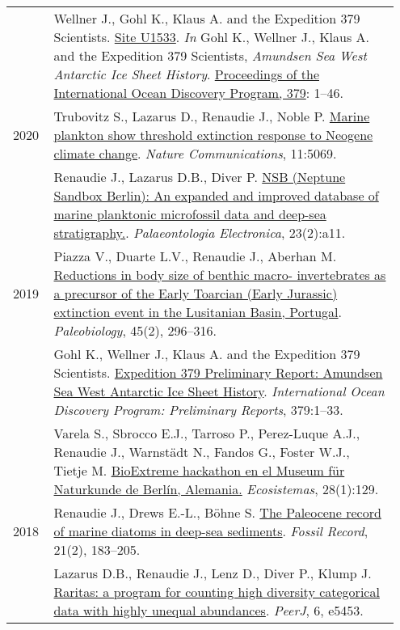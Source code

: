 \documentclass[11pt, a4paper]{article}
\makeatletter
\newcommand\fnoteref[1]{\protected@xdef\@theenmark{\ref{#1}}\@endnotemark}
\makeatother
\begin{document}
\begin{longtable}{@{}p{0.1\linewidth} >{\small}P{0.85\linewidth}@{}}
    & Wellner J., Gohl K., Klaus A. and the Expedition 379 Scientists\fnoteref{exp379scientists}. \href{https://doi.org/10.14379/iodp.proc.379.104.2021}{Site U1533}. \textit{In} Gohl K., Wellner J., Klaus A. and the Expedition 379 Scientists, \textit{Amundsen Sea West Antarctic Ice Sheet History}. \href{http://publications.iodp.org/proceedings/379/379title.html}{Proceedings of the International Ocean Discovery Program, 379}: 1--46.\\
2020 & Trubovitz S., Lazarus D., Renaudie J., Noble P. \href{http://doi.org/10.1038/s41467-020-18879-7}{Marine plankton show threshold extinction response to Neogene climate change}. \textit{Nature Communications}, 11:5069.\\
    & Renaudie J., Lazarus D.B., Diver P. \href{https://palaeo-electronica.org/content/2020/2966-the-nsb-database}{NSB (Neptune Sandbox Berlin): An expanded and improved database of marine planktonic microfossil data and deep-sea stratigraphy.}. \textit{Palaeontologia Electronica}, 23(2):a11.\\
2019 & Piazza V., Duarte L.V., Renaudie J., Aberhan M. \href{http://doi.org/10.1017/pab.2019.11}{Reductions in body size of benthic macro- invertebrates as a precursor of the Early Toarcian (Early Jurassic) extinction event in the Lusitanian Basin, Portugal}. \textit{Paleobiology}, 45(2), 296--316.\\
    & Gohl K., Wellner J., Klaus A. and the Expedition 379 Scientists\fnoteref{exp379scientists}. \href{http://publications.iodp.org/preliminary_report/379/index.html}{Expedition 379 Preliminary Report: Amundsen Sea West Antarctic Ice Sheet History}. \textit{International Ocean Discovery Program: Preliminary Reports}, 379:1--33.\\
    & Varela S., Sbrocco E.J., Tarroso P., Perez-Luque A.J., Renaudie J., Warnst\"{a}dt N., Fandos G., Foster W.J., Tietje M. \href{http://dx.doi.org/10.7818/ECOS.1707}{BioExtreme hackathon en el Museum f\"{u}r Naturkunde de Berlín, Alemania.} \textit{Ecosistemas}, 28(1):129.\\
2018 & Renaudie J., Drews E.-L., B\"{o}hne S. \href{http://dx.doi.org/10.5194/fr-21-183-2018}{The Paleocene record of marine diatoms in deep-sea sediments}. \textit{Fossil Record}, 21(2), 183--205.\\
    & Lazarus D.B., Renaudie J., Lenz D., Diver P., Klump J. \href{http://dx.doi.org/10.7717/peerj.5453}{Raritas: a program for counting high diversity categorical data with highly unequal abundances}. \textit{PeerJ}, 6, e5453.\\

\end{longtable}
\end{document}
